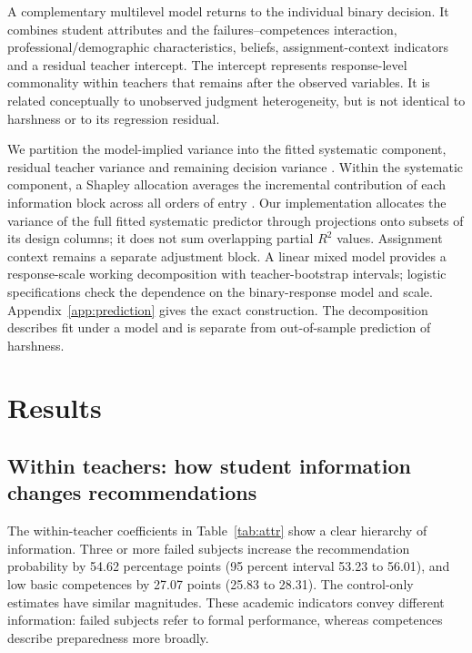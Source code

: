 \begin{addition}
A complementary multilevel model returns to the individual binary decision. It combines student attributes and the failures--competences interaction, professional/demographic characteristics, beliefs, assignment-context indicators and a residual teacher intercept. The intercept represents response-level commonality within teachers that remains after the observed variables. It is related conceptually to unobserved judgment heterogeneity, but is not identical to harshness or to its regression residual.

We partition the model-implied variance into the fitted systematic component, residual teacher variance and remaining decision variance \cite{nakagawa,stoffel}. Within the systematic component, a Shapley allocation averages the incremental contribution of each information block across all orders of entry \cite{groemping}. Our implementation allocates the variance of the full fitted systematic predictor through projections onto subsets of its design columns; it does not sum overlapping partial $R^2$ values. Assignment context remains a separate adjustment block. A linear mixed model provides a response-scale working decomposition with teacher-bootstrap intervals; logistic specifications check the dependence on the binary-response model and scale. Appendix~\ref{app:prediction} gives the exact construction. The decomposition describes fit under a model and is separate from out-of-sample prediction of harshness.
\end{addition}

\section{Results}
\subsection{Within teachers: how student information changes recommendations}
The within-teacher coefficients in Table~\ref{tab:attr} show a clear hierarchy of information. Three or more failed subjects increase the recommendation probability by 54.62 percentage points (95 percent interval 53.23 to 56.01), and low basic competences by 27.07 points (25.83 to 28.31). The control-only estimates have similar magnitudes. These academic indicators convey different information: failed subjects refer to formal performance, whereas competences describe preparedness more broadly.

